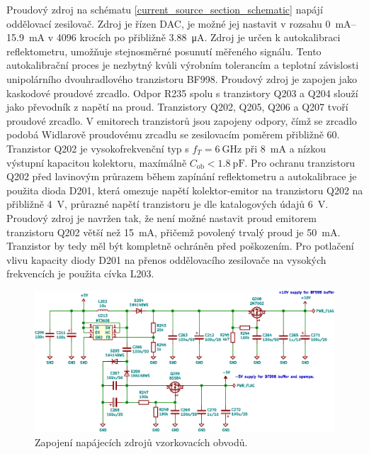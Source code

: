Proudový zdroj na schématu \ref{current_source_section_schematic} napájí oddělovací zesilovač. Zdroj je řízen \acrshort{DAC}, je možné jej nastavit v rozsahu \SIrange{0}{15.9}{\si{mA}} v 4096 krocích po přibližně \SI{3.88}{\micro\ampere}. Zdroj je určen k autokalibraci reflektometru, umožňuje stejnosměrné posunutí měřeného signálu. Tento autokalibrační proces je nezbytný kvůli výrobním tolerancím a teplotní závislosti unipolárního dvouhradlového tranzistoru BF998. Proudový zdroj je zapojen jako kaskodové proudové zrcadlo. Odpor R235 spolu s tranzistory Q203 a Q204 slouží jako převodník z napětí na proud. Tranzistory Q202, Q205, Q206 a Q207 tvoří proudové zrcadlo. V emitorech tranzistorů jsou zapojeny odpory, čímž se zrcadlo podobá Widlarově proudovému zrcadlu se zesilovacím poměrem přibližně 60. Tranzistor Q202 je vysokofrekvenční typ s $f_T=\SI{6}{\giga\hertz}$ při \SI{8}{\milli\ampere} a nízkou výstupní kapacitou kolektoru, maxímálně $C_\mathrm{ob}<\SI{1.8}{\pico\farad}$. Pro ochranu tranzistoru Q202 před lavinovým průrazem během zapínání reflektometru a autokalibrace je použita dioda D201, která omezuje napětí kolektor-emitor na tranzistoru Q202 na přibližně \SI{4}{\volt}, průrazné napětí tranzistoru je dle katalogových údajů \SI{6}{\volt}. Proudový zdroj je navržen tak, že není možné nastavit proud emitorem tranzistoru Q202 větší než \SI{15}{\milli\ampere}, přičemž povolený trvalý proud je \SI{50}{\milli\ampere}. Tranzistor by tedy měl být kompletně ochráněn před poškozením. Pro potlačení vlivu kapacity diody D201 na přenos oddělovacího zesilovače na vysokých frekvencích je použita cívka L203.

\begin{figure}[htbp]
\includegraphics[width=\textwidth,keepaspectratio]{images/power_supply_section.eps}\caption{Zapojení napájecích zdrojů vzorkovacích obvodů.}\label{analog_source_section_schematic}
\end{figure}


